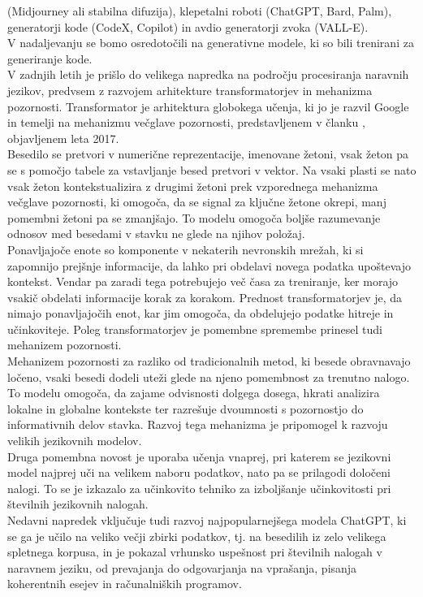 \documentclass[a4paper,12pt,openright]{book}
\begin{document}
(Midjourney ali stabilna difuzija), klepetalni roboti (ChatGPT, Bard,
Palm), generatorji kode (CodeX, Copilot) in avdio
generatorji zvoka (VALL-E). \cite{Hadi_2023} \\
V nadaljevanju se bomo osredotočili na generativne modele, ki so bili trenirani za generiranje kode. \\
V zadnjih letih je prišlo do velikega napredka na področju procesiranja naravnih jezikov, predvsem z razvojem arhitekture transformatorjev in mehanizma pozornosti.
Transformator je arhitektura globokega učenja, ki jo je razvil Google in temelji na mehanizmu večglave pozornosti, predstavljenem v članku \cite{datacamp_attention_2024}, objavljenem leta 2017.   \\
Besedilo se pretvori v numerične reprezentacije, imenovane žetoni, vsak žeton pa se s pomočjo tabele za vstavljanje besed pretvori v vektor. Na vsaki plasti se nato vsak žeton kontekstualizira z drugimi žetoni prek vzporednega mehanizma večglave pozornosti, ki omogoča, da se signal za ključne žetone okrepi, manj pomembni žetoni pa se zmanjšajo. To modelu omogoča boljše razumevanje odnosov med besedami v stavku ne glede na njihov položaj. \\
Ponavljajoče enote so komponente v nekaterih nevronskih mrežah, ki si zapomnijo prejšnje informacije, da lahko pri obdelavi novega podatka upoštevajo kontekst. Vendar pa zaradi tega potrebujejo več časa za treniranje, ker morajo vsakič obdelati informacije korak za korakom.
Prednost transformatorjev je, da nimajo ponavljajočih enot, kar jim omogoča, da obdelujejo podatke hitreje in učinkoviteje. Poleg transformatorjev je pomembne spremembe prinesel tudi mehanizem pozornosti. \cite{NIPS2017_3f5ee243} \\
Mehanizem pozornosti za razliko od tradicionalnih metod, ki besede obravnavajo ločeno, vsaki besedi dodeli uteži glede na njeno pomembnost za trenutno nalogo. To modelu omogoča, da zajame odvisnosti dolgega dosega, hkrati analizira lokalne in globalne kontekste ter razrešuje dvoumnosti s pozornostjo do informativnih delov stavka. Razvoj tega mehanizma je pripomogel k razvoju velikih jezikovnih modelov. \cite{datacamp_attention_2024, KASNECI2023102274} \\
Druga pomembna novost je uporaba učenja vnaprej, pri katerem se jezikovni model najprej uči na velikem naboru podatkov, nato pa se prilagodi določeni nalogi. To se je izkazalo za učinkovito tehniko za izboljšanje učinkovitosti pri številnih jezikovnih nalogah. \\
Nedavni napredek vključuje tudi razvoj najpopularnejšega modela ChatGPT, ki se ga je učilo na veliko večji zbirki podatkov, tj. na besedilih iz zelo velikega spletnega korpusa, in je pokazal vrhunsko uspešnost pri številnih nalogah v naravnem jeziku, od prevajanja do odgovarjanja na vprašanja, pisanja koherentnih esejev in računalniških programov. \cite{KASNECI2023102274} \\
\end{document}
